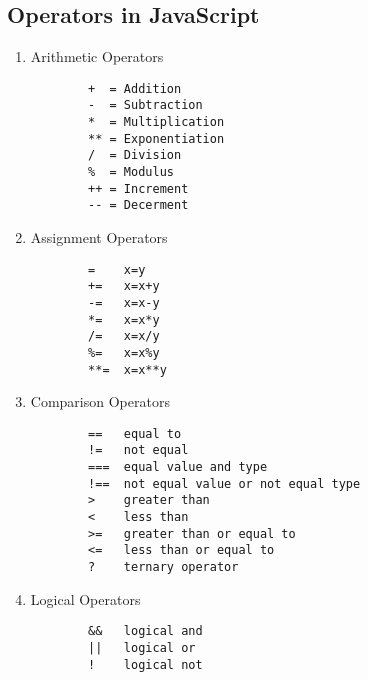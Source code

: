 \documentclass[11pt]{article}
\begin{document}
\subsection*{Operators in JavaScript}
\label{sec:org74cf058}
\begin{enumerate}
\item Arithmetic Operators \\
\begin{verbatim}
        +  = Addition
        -  = Subtraction
        *  = Multiplication
        ** = Exponentiation
        /  = Division
        %  = Modulus
        ++ = Increment
        -- = Decerment
\end{verbatim}

\item Assignment Operators
\begin{verbatim}
        =    x=y
        +=   x=x+y
        -=   x=x-y
        *=   x=x*y
        /=   x=x/y
        %=   x=x%y
        **=  x=x**y
\end{verbatim}

\item Comparison Operators
\begin{verbatim}
        ==   equal to
        !=   not equal
        ===  equal value and type
        !==  not equal value or not equal type
        >    greater than
        <    less than
        >=   greater than or equal to
        <=   less than or equal to
        ?    ternary operator
\end{verbatim}
\item Logical Operators
\begin{verbatim}
        &&   logical and
        ||   logical or
        !    logical not
\end{verbatim}
\end{enumerate}
\end{document}
